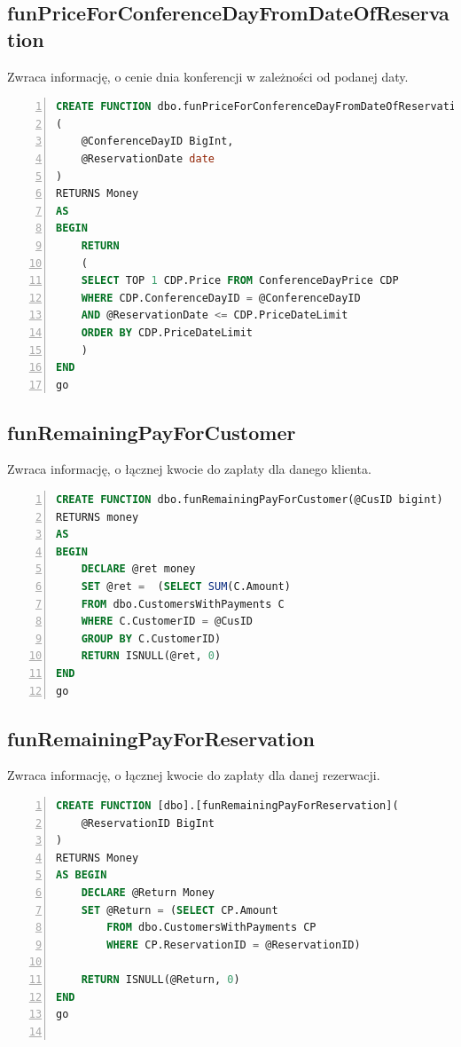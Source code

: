 \documentclass[]{article}
\begin{document}
	\subsection{funPriceForConferenceDayFromDateOfReservation}
Zwraca informację, o cenie dnia konferencji w zależności od podanej daty.
\begin{lstlisting}[language=SQL,
showspaces=false,
basicstyle=\ttfamily,
numbers=left,
numberstyle=\tiny,
tabsize=2,
backgroundcolor=\color{lightg},
keywordstyle=\color{lightblue},
commentstyle=\color{gray}]
CREATE FUNCTION dbo.funPriceForConferenceDayFromDateOfReservation
(	
	@ConferenceDayID BigInt,
	@ReservationDate date
)
RETURNS Money 
AS
BEGIN
	RETURN 
	(
	SELECT TOP 1 CDP.Price FROM ConferenceDayPrice CDP
	WHERE CDP.ConferenceDayID = @ConferenceDayID
	AND @ReservationDate <= CDP.PriceDateLimit
	ORDER BY CDP.PriceDateLimit  
	)
END
go

\end{lstlisting}
	
	
	
	\subsection{funRemainingPayForCustomer}
	Zwraca informację, o łącznej kwocie do zapłaty dla danego klienta.
	\begin{lstlisting}[language=SQL,
	showspaces=false,
	basicstyle=\ttfamily,
	numbers=left,
	numberstyle=\tiny,
	tabsize=2,
	backgroundcolor=\color{lightg},
	keywordstyle=\color{lightblue},
	commentstyle=\color{gray}]
CREATE FUNCTION dbo.funRemainingPayForCustomer(@CusID bigint)
RETURNS money
AS
BEGIN
	DECLARE @ret money
	SET @ret =	(SELECT SUM(C.Amount)
	FROM dbo.CustomersWithPayments C
	WHERE C.CustomerID = @CusID
	GROUP BY C.CustomerID)
	RETURN ISNULL(@ret, 0)
END
go

	\end{lstlisting}
	
	\subsection{funRemainingPayForReservation}
	Zwraca informację, o łącznej kwocie do zapłaty dla danej rezerwacji.
	\begin{lstlisting}[language=SQL,
	showspaces=false,
	basicstyle=\ttfamily,
	numbers=left,
	numberstyle=\tiny,
	tabsize=2,
	backgroundcolor=\color{lightg},
	keywordstyle=\color{lightblue},
	commentstyle=\color{gray}]
CREATE FUNCTION [dbo].[funRemainingPayForReservation](
	@ReservationID BigInt
)
RETURNS Money
AS BEGIN
	DECLARE @Return Money
	SET @Return = (SELECT CP.Amount
		FROM dbo.CustomersWithPayments CP
		WHERE CP.ReservationID = @ReservationID)
	
	RETURN ISNULL(@Return, 0)
END
go
	
	\end{lstlisting}
	
\end{document}
